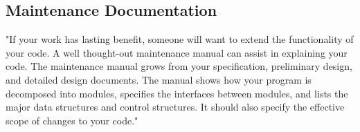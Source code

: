 \subsection{Maintenance Documentation}

"If your work has lasting benefit, someone will want to extend the functionality of your code. A well thought-out maintenance manual can assist in explaining your code. The maintenance manual grows from your specification, preliminary design, and detailed design documents. The manual shows how your program is decomposed into modules, specifies the interfaces between modules, and lists the major data structures and control structures. It should also specify the effective scope of changes to your code."

